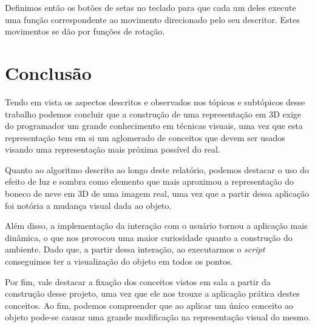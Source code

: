 \documentclass[
	article,			%
	11pt,				%
	oneside,			%
	a4paper,			%
	english,			%
	brazil,				%
	sumario=tradicional
	]{abntex2}
\begin{document}
Definimos então os botões de setas no teclado para que cada um deles execute uma função
correspondente ao movimento direcionado pelo seu descritor. Estes movimentos se dão por funções de rotação.



\section{Conclusão}

Tendo em vista os aspectos descritos e observados nos tópicos e subtópicos desse 
trabalho podemos concluir que a construção de uma representação em 3D exige do programador
um grande conhecimento em técnicas visuais, uma vez que esta representação tem em si um aglomerado
de conceitos que devem ser usados visando uma representação mais próxima possível do real.

Quanto ao algoritmo descrito ao longo deste relatório, podemos destacar o uso do efeito de luz e sombra como
elemento que mais aproximou a representação do boneco de neve em 3D de uma imagem real, uma vez
que a partir dessa aplicação foi notória a mudança visual dada ao objeto.

Além disso, a implementação da interação com o usuário tornou a aplicação mais dinâmica, o que
nos provocou uma maior curiosidade quanto a construção do ambiente. Dado que, a partir dessa interação,
ao executarmos o \textit{script} conseguimos ter a visualização do objeto em todos os pontos.

Por fim, vale destacar a fixação dos conceitos vistos em sala a partir da construção desse projeto,
uma vez que ele nos trouxe a aplicação prática destes conceitos. Ao fim, podemos compreender que ao aplicar um único
conceito ao objeto pode-se causar uma grande modificação na representação visual do mesmo.
\end{document}
